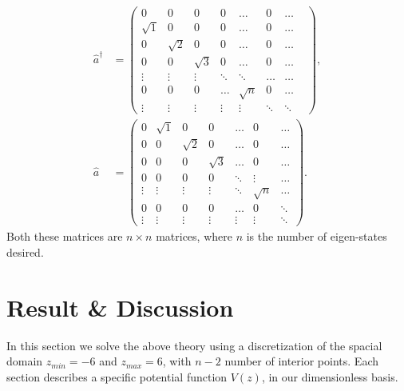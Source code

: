 \documentclass[a4paper]{article}
\begin{document}
\begin{align*}
    \hat{a}^\dagger &= \begin{pmatrix}
        0 & 0 & 0 & 0 & \dots & 0 & \dots \\
        \sqrt{1} & 0 & 0 & 0 & \dots & 0 & \dots \\
        0 & \sqrt{2} & 0 & 0 & \dots & 0 & \dots \\
        0 & 0 & \sqrt{3} & 0 & \dots & 0 & \dots \\
        \vdots & \vdots & \vdots & \ddots & \ddots & \dots & \dots \\
        0 & 0 & 0 & \dots & \sqrt{n} & 0 & \dots & \\
        \vdots & \vdots & \vdots & \vdots & \vdots & \ddots & \ddots
    \end{pmatrix},\\
    \hat{a} &= \begin{pmatrix}
    0 & \sqrt{1} & 0 & 0 & \dots & 0 & \dots \\
    0 & 0 & \sqrt{2} & 0 & \dots & 0 & \dots \\
    0 & 0 & 0 & \sqrt{3} & \dots & 0 & \dots \\
    0 & 0 & 0 & 0 & \ddots & \vdots & \dots \\
    \vdots & \vdots & \vdots & \vdots & \ddots & \sqrt{n} & \dots \\
    0 & 0 & 0 & 0 & \dots & 0 & \ddots \\
    \vdots & \vdots & \vdots & \vdots & \vdots & \vdots & \ddots
    \end{pmatrix}.
\end{align*}Both these matrices are $n\times n$ matrices, where $n$ is the number of eigen-states desired.

\section{Result \& Discussion}
In this section we solve the above theory using a discretization of the spacial domain $z_{min}= -6$ and $z_{max} = 6$, with $n - 2$ number of interior points. 
Each section describes a specific potential function $V(z)$, in our dimensionless basis.
\end{document}
